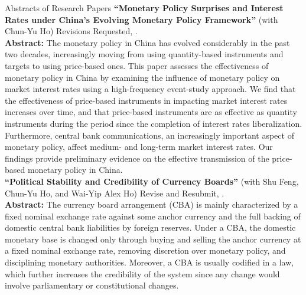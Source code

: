 \documentclass{resume_liang} %
\begin{document}
\newpage
\begin{rSection}{Abstracts of Research Papers}
	\textbf{``Monetary Policy Surprises and Interest Rates under China's Evolving Monetary Policy Framework''} (with Chun-Yu Ho) Revisions Requested,  \textit{}.\vspace{0.1cm}\\ 
	\textbf{Abstract:} The monetary policy in China has evolved considerably in the past two decades, increasingly moving from using quantity-based instruments and targets to using price-based ones. This paper assesses the effectiveness of monetary policy in China by examining the influence of monetary policy on market interest rates using a high-frequency event-study approach. We find that the effectiveness of price-based instruments in impacting market interest rates increases over time, and that price-based instruments are as effective as quantity instruments during the period since the completion of interest rates liberalization. Furthermore, central bank communications, an increasingly important aspect of monetary policy, affect medium- and long-term market interest rates. Our findings provide preliminary evidence on the effective transmission of the price-based monetary policy in China. \\
	
	\textbf{``Political Stability and Credibility of Currency Boards''} (with Shu Feng, Chun-Yu Ho, and Wai-Yip Alex Ho) Revise and Resubmit, \textit{}.\vspace{0.1cm}\\
	\textbf{Abstract:} The currency board arrangement (CBA) is mainly characterized by a fixed nominal exchange rate against some anchor currency and the full backing of domestic central bank liabilities by foreign reserves. Under a CBA, the domestic monetary base is changed only through buying and selling the anchor currency at a fixed nominal exchange rate, removing discretion over monetary policy, and disciplining monetary authorities. Moreover, a CBA is usually codified in a law, which further increases the credibility of the system since any change would involve parliamentary or constitutional changes.  
	

\end{rSection}
\end{document}
